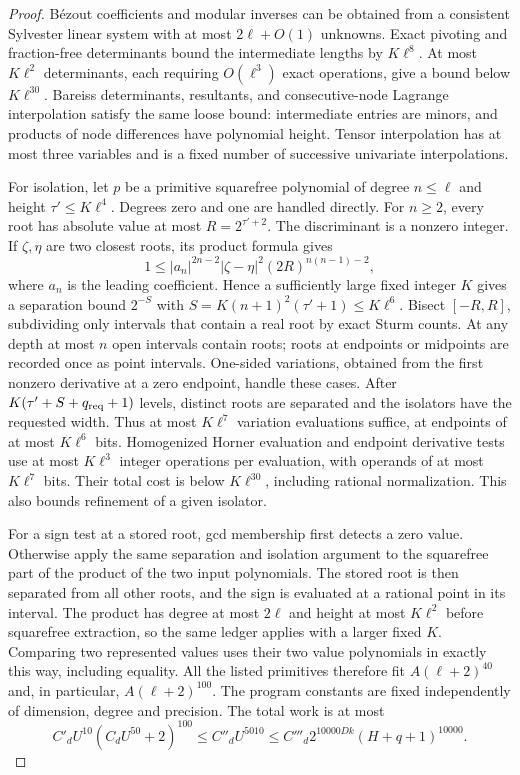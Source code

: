 \begin{proof}
B\'ezout coefficients and modular inverses can be obtained from a consistent
Sylvester linear system with at most $2\ell+O(1)$ unknowns. Exact pivoting
and fraction-free determinants bound the intermediate lengths by
$K\ell^8$. At most $K\ell^2$ determinants, each requiring $O(\ell^3)$
exact operations, give a bound below $K\ell^{30}$. Bareiss determinants,
resultants, and consecutive-node Lagrange interpolation satisfy the same
loose bound: intermediate entries are minors, and products of node
differences have polynomial height. Tensor interpolation has at most three
variables and is a fixed number of successive univariate interpolations.

For isolation, let $p$ be a primitive squarefree polynomial of degree
$n\le\ell$ and height $\tau'\le K\ell^4$. Degrees zero and one are handled
directly. For $n\ge2$, every root has absolute value at most
$R=2^{\tau'+2}$. The discriminant is a nonzero integer. If $\zeta,\eta$
are two closest roots, its product formula gives
\[
 1\le |a_n|^{2n-2}|\zeta-\eta|^2
           (2R)^{n(n-1)-2},
\]
where $a_n$ is the leading coefficient. Hence a sufficiently large fixed
integer $K$ gives a separation bound $2^{-S}$ with
$S=K(n+1)^2(\tau'+1)\le K\ell^6$.
Bisect $[-R,R]$, subdividing only intervals that contain a real root by
exact Sturm counts. At any depth at most $n$ open intervals contain roots;
roots at endpoints or midpoints are recorded once as point intervals.
One-sided variations, obtained from the first nonzero derivative at a zero
endpoint, handle these cases. After
$K(\tau'+S+q_{\rm req}+1)$ levels, distinct roots are separated and the
isolators have the requested width. Thus at most $K\ell^7$ variation
evaluations suffice, at endpoints of at most $K\ell^6$ bits.
Homogenized Horner evaluation and endpoint derivative tests use at most
$K\ell^3$ integer operations per evaluation, with operands of at most
$K\ell^7$ bits. Their total cost is below $K\ell^{30}$, including rational
normalization. This also bounds refinement of a given isolator.

For a sign test at a stored root, gcd membership first detects a zero value.
Otherwise apply the same separation and isolation argument to the
squarefree part of the product of the two input polynomials. The stored
root is then separated from all other roots, and the sign is evaluated at
a rational point in its interval. The product has degree at most $2\ell$
and height at most $K\ell^2$ before squarefree extraction, so the same
ledger applies with a larger fixed $K$. Comparing two represented values
uses their two value polynomials in exactly this way, including equality.
All the listed primitives therefore fit $A(\ell+2)^{40}$ and, in
particular, $A(\ell+2)^{100}$. The program constants are fixed independently
of dimension, degree and precision. The total work is at most
\[
 C'_dU^{10}(C_dU^{50}+2)^{100}
 \le C''_dU^{5010}
 \le C'''_d2^{10000Dk}(H+q+1)^{10000}.
\]
\end{proof}

